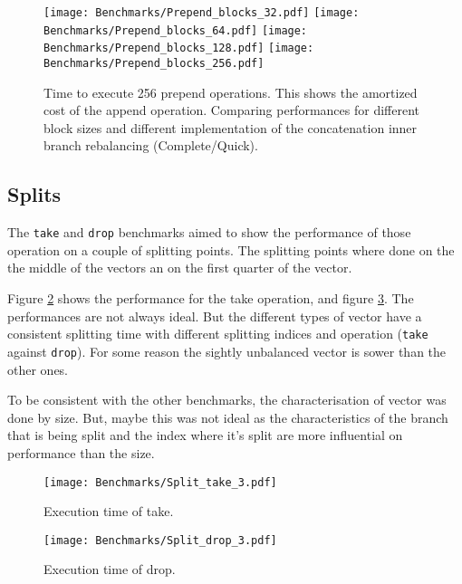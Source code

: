 \begin{figure}[h!]
  \centering
  \texttt{[image: Benchmarks/Prepend\_blocks\_32.pdf]}
  \texttt{[image: Benchmarks/Prepend\_blocks\_64.pdf]}
  \texttt{[image: Benchmarks/Prepend\_blocks\_128.pdf]}
  \texttt{[image: Benchmarks/Prepend\_blocks\_256.pdf]}
  \caption{Time to execute 256 prepend operations. This shows the amortized cost of the append operation. Comparing performances for different block sizes and different implementation of the concatenation inner branch rebalancing (Complete/Quick).}
  \label{PrependBlocksBenchmarks}
\end{figure}

\FloatBarrier

\subsection{Splits}
The \texttt{take} and \texttt{drop} benchmarks aimed to show the performance of those operation on a couple of splitting points. The splitting points where done on the the middle of the vectors an on the first quarter of the vector.

Figure \ref{TakeBenchmarks} shows the performance for the take operation, and figure \ref{DropBenchmarks}. The performances are not always ideal. But the different types of vector have a consistent splitting time with different splitting indices and operation (\texttt{take} against \texttt{drop}). For some reason the sightly unbalanced vector is sower than the other ones. 

To be consistent with the other benchmarks, the characterisation of vector was done by size. But, maybe this was not ideal as the characteristics of the branch that is being split and the index where it's split are more influential on performance than the size. 


\begin{figure}[h!]
  \centering
  \texttt{[image: Benchmarks/Split\_take\_3.pdf]}
  \caption{Execution time of take.}
  \label{TakeBenchmarks}
\end{figure}


\begin{figure}[h!]
  \centering
  \texttt{[image: Benchmarks/Split\_drop\_3.pdf]}
  \caption{Execution time of drop.}
  \label{DropBenchmarks}
\end{figure}


